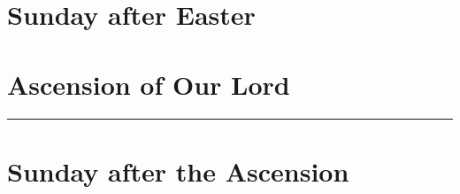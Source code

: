 {{
\section{ Sunday after Easter}
\label{easter5}
\printcommonvespers{}
\def\premagverses{\oldneedspace{12\baselineskip}}
\def\precollect{\printvrmanenobiscum}
\def\postmagtitle{\label{easter5-mag}}
\benedicamusdomino{}
}

{
\section{Ascension of Our Lord}
\label{ascension}
\subtitle{ Class}
\subtitle{I \& II Vespers}

\def\deusinadjutoriumsolemn{T}
\def\prepsalmthreeverses{}
\def\prevr{\needspace{12\baselineskip}}
\def\premagnificat{\oldneedspace{7\baselineskip}}
\def\begincollectcols{%
\begin{parcolumns}[rulebetween,colwidths={1=0.46\linewidth}]{2}}
\def\definevesperspropers{
}
\def\definevesperspropersalt{
}
\def\vesperspropersnote{At II Vespers:
\medskip}
\def\vesperspropersaltnote{At I Vespers:
\medskip}
\let\printhymnnote=\undefined
\def\hymnlabel{hymn-salutishumanaesator}
\def\prevr{\bigskip{}
\emph{On the Sunday after the Ascension, \emph{\Vbar{}~Dóminus in cælo}, p.~\pageref{vr-sundayafterascension}}.

\bigskip}

\def\commemorations{If today is April 30 or May 1, \emph{First Vespers of St Joseph the Worker} is commemorated as on page \pageref{stjoseph-worker-commem}.}
\printcommemnote[1]{}
\bigskip
\hrule
}

{
\section{Sunday after the Ascension}
\label{easter6}\label{sundayafterascension}
\printcommonvespers{}
\renewcommand{\printhymnnote}{
    \medskip
    \noindent\printnote{Hymn.~\emph{Salútis humánæ Sator}, page \pageref{hymn-salutishumanaesator}.}
    \medskip
    \def\vrlinebreak{T}
    \label{vr-sundayafterascension}
    \printvr[\greseteolcustos{manual}]{\vrtex}{\vtranslation}{\rtranslation}
}
\def\precollect{\printvrdominusincaelo}
\def\premagtitle{\bigskip\bigskip}
\def\postmagtitle{\label{easter6-mag}\label{sundayafterascension-mag}}
\def\premagverses{\oldneedspace{10\baselineskip}}
\benedicamusdomino{}
}
}